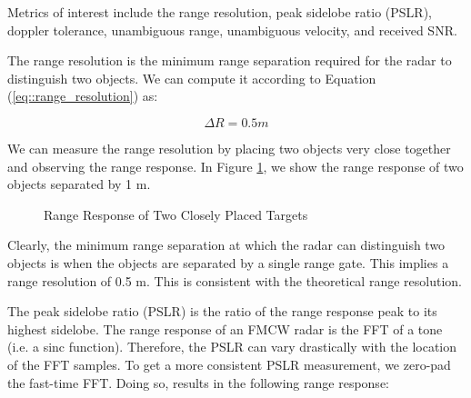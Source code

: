 \documentclass[conference]{IEEEtran}
\begin{document}
	Metrics of interest include the range resolution, peak sidelobe ratio (PSLR), doppler tolerance, unambiguous range, unambiguous velocity, and received SNR.

	The range resolution is the minimum range separation required for the radar to distinguish two objects. We can compute it according to Equation (\ref{eq::range_resolution}) as:
	
	\begin{equation}
		{\Delta}R = 0.5 m
	\end{equation}
	
	We can measure the range resolution by placing two objects very close together and observing the range response. In Figure \ref{fig::range_resolution}, we show the range response of two objects separated by 1 m. 
	 
	\begin{figure}[H]
	    	\centering
	    	\caption{Range Response of Two Closely Placed Targets}
	    	\label{fig::range_resolution}
	\end{figure}
		
	Clearly, the minimum range separation at which the radar can distinguish two objects is when the objects are separated by a single range gate. This implies a range resolution of 0.5 m. This is consistent with the theoretical range resolution.
	
	The peak sidelobe ratio (PSLR) is the ratio of the range response peak to its highest sidelobe. The range response of an FMCW radar is the FFT of a tone (i.e. a sinc function). Therefore, the PSLR can vary drastically with the location of the FFT samples. To get a more consistent PSLR measurement, we zero-pad the fast-time FFT. Doing so, results in the following range response:
	
\end{document}
